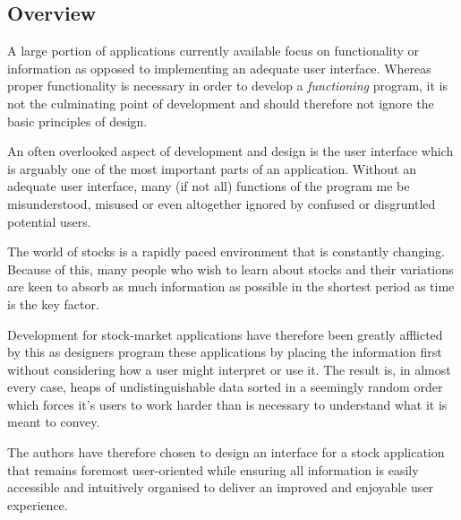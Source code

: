 \documentclass{sigchi}
\begin{document}
\subsection{Overview}
A large portion of applications currently available focus on functionality or information as opposed to implementing an adequate user interface. Whereas proper functionality is necessary in order to develop a \textit{functioning} program, it is not the culminating point of development and should therefore not ignore the basic principles of design. \par
An often overlooked aspect of development and design is the user interface which is arguably one of the most important parts of an application. Without an adequate user interface, many (if not all) functions of the program me be misunderstood, misused or even altogether ignored by confused or disgruntled potential users. \par
The world of stocks is a rapidly paced environment that is constantly changing. Because of this, many people who wish to learn about stocks and their variations are keen to absorb as much information as possible in the shortest period as time is the key factor. \par 
Development for stock-market applications have therefore been greatly afflicted by this as designers program these applications by placing the information first without considering how a user might interpret or use it. The result is, in almost every case, heaps of undistinguishable data sorted in a seemingly random order which forces it's users to work harder than is necessary to understand what it is meant to convey. \par
The authors have therefore chosen to design an interface for a stock application that remains foremost user-oriented while ensuring all information is easily accessible and intuitively organised to deliver an improved and enjoyable user experience. 
\end{document}
